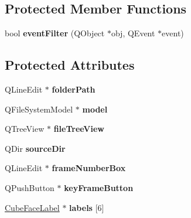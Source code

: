 \subsection*{\-Protected \-Member \-Functions}
\begin{DoxyCompactItemize}
\item 
\hypertarget{class_cube_map_loader_aea276fce89766328afca6b3e57c5819f}{
bool {\bfseries event\-Filter} (\-Q\-Object $\ast$obj, \-Q\-Event $\ast$event)}
\label{class_cube_map_loader_aea276fce89766328afca6b3e57c5819f}

\end{DoxyCompactItemize}
\subsection*{\-Protected \-Attributes}
\begin{DoxyCompactItemize}
\item 
\hypertarget{class_cube_map_loader_a93dca3d3c2fbd3017c0ec0e772b47923}{
\-Q\-Line\-Edit $\ast$ {\bfseries folder\-Path}}
\label{class_cube_map_loader_a93dca3d3c2fbd3017c0ec0e772b47923}

\item 
\hypertarget{class_cube_map_loader_a8ab57182be287da1eb6ad2773263dd4f}{
\-Q\-File\-System\-Model $\ast$ {\bfseries model}}
\label{class_cube_map_loader_a8ab57182be287da1eb6ad2773263dd4f}

\item 
\hypertarget{class_cube_map_loader_a427dfbdf8e625ff8e46123335ae96a58}{
\-Q\-Tree\-View $\ast$ {\bfseries file\-Tree\-View}}
\label{class_cube_map_loader_a427dfbdf8e625ff8e46123335ae96a58}

\item 
\hypertarget{class_cube_map_loader_a78722f57a4d5b1b1d5e397bc1f111aa9}{
\-Q\-Dir {\bfseries source\-Dir}}
\label{class_cube_map_loader_a78722f57a4d5b1b1d5e397bc1f111aa9}

\item 
\hypertarget{class_cube_map_loader_a1841322b15f554edb0729b56f990b133}{
\-Q\-Line\-Edit $\ast$ {\bfseries frame\-Number\-Box}}
\label{class_cube_map_loader_a1841322b15f554edb0729b56f990b133}

\item 
\hypertarget{class_cube_map_loader_a787df3d6bf277469ee707ac3b39cec57}{
\-Q\-Push\-Button $\ast$ {\bfseries key\-Frame\-Button}}
\label{class_cube_map_loader_a787df3d6bf277469ee707ac3b39cec57}

\item 
\hypertarget{class_cube_map_loader_a1915b789ae3b2508487c85305dba886d}{
\hyperlink{class_cube_face_label}{\-Cube\-Face\-Label} $\ast$ {\bfseries labels} \mbox{[}6\mbox{]}}
\label{class_cube_map_loader_a1915b789ae3b2508487c85305dba886d}


\end{DoxyCompactItemize}
